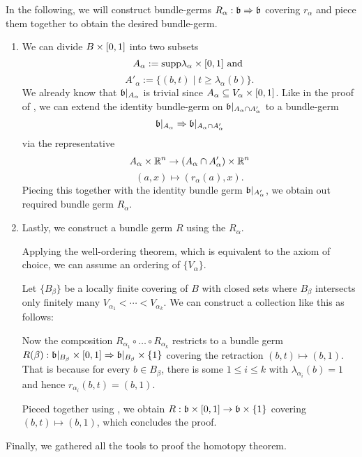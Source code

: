 \begin{scope}
\begin{myproof}
    In the following, we will construct bundle-germs $R_\alpha: \mathfrak{b} \Rightarrow{}{} \mathfrak{b}$ covering $r_\alpha$
    and piece them together to obtain the desired bundle-germ.
    \begin{enumerate}
        \item 
        We can divide $B \times [0, 1]$ into two subsets
        \[ A_\alpha := \text{supp} \lambda_\alpha \times [0, 1] \text{ and } \]
        \[ A'_\alpha := \{(b, t) \mid t \ge \lambda_\alpha(b)\}. \]
        We already know that $\mathfrak{b}\vert_{A_\alpha}$ is trivial since $A_\alpha \subseteq{} V_\alpha \times [0, 1]$.
        Like in the proof of , we can extend the identity bundle-germ on $\mathfrak{b}\vert_{A_\alpha \cap A_\alpha'}$ to a bundle-germ
        \[ \mathfrak{b}\vert_{A_\alpha} \Rightarrow{} \mathfrak{b}\vert_{A_\alpha \cap A_\alpha'} \]
        via the representative
        \[ A_\alpha \times \mathbb{R}^n \to (A_\alpha \cap A_\alpha') \times \mathbb{R}^n\]
        \[ (a, x) \mapsto (r_\alpha(a), x). \]
        Piecing this together with the identity bundle germ $\mathfrak{b}\vert_{A_\alpha'}$, we obtain out required bundle germ $R_\alpha$.
        
        \item Lastly, we construct a bundle germ $R$ using the $R_\alpha$.

        Applying the well-ordering theorem, which is equivalent to the axiom of choice, we can assume an ordering of $\{ V_\alpha \}$.

        Let $\{B_\beta\}$ be a locally finite covering of $B$ with closed sets where $B_\beta$ intersects only finitely many $V_{\alpha_1} < \cdots < V_{\alpha_k}$.
        We can construct a collection like this as follows:

        Now the composition $R_{\alpha_1} \circ \ldots \circ R_{\alpha_k}$ restricts to a bundle germ $R(\beta): \mathfrak{b}\vert_{B_\beta} \times [0, 1] \Rightarrow{} \mathfrak{b}\vert_{B_\beta} \times \{1\}$ covering the retraction $(b, t) \mapsto (b, 1)$.
        That is because for every $b \in B_\beta$, there is some $1 \le i \le k$ with $\lambda_{\alpha_i}(b) = 1$ and hence $r_{\alpha_i}(b, t) = (b, 1)$.
        
        Pieced together using , we obtain $R: \mathfrak{b} \times [0, 1]\to \mathfrak{b} \times \{1\}$ covering $(b, t) \mapsto (b, 1)$, which concludes the proof.
    \end{enumerate}    
\end{myproof}

\begin{myparagraph}
    Finally, we gathered all the tools to proof the homotopy theorem.
\end{myparagraph}


\end{scope}
